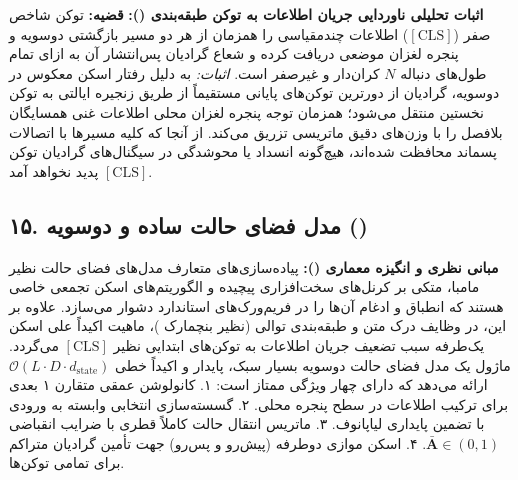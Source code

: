 \textbf{اثبات تحلیلی ناوردایی جریان اطلاعات به توکن طبقه‌بندی ():}
\textbf{قضیه:} توکن شاخص صفر ($[\text{CLS}]$) اطلاعات چندمقیاسی را همزمان از هر دو مسیر بازگشتی دوسویه و پنجره لغزان موضعی دریافت کرده و شعاع گرادیان پس‌انتشار آن به ازای تمام طول‌های دنباله $N$ کران‌دار و غیرصفر است.
\textit{اثبات:} به دلیل رفتار اسکن معکوس در  دوسویه، گرادیان از دورترین توکن‌های پایانی مستقیماً از طریق زنجیره ایالتی به توکن نخستین منتقل می‌شود؛ همزمان توجه پنجره لغزان محلی اطلاعات غنی همسایگان بلافصل را با وزن‌های دقیق ماتریسی تزریق می‌کند. از آنجا که کلیه مسیرها با اتصالات پسماند محافظت شده‌اند، هیچ‌گونه انسداد یا محوشدگی در سیگنال‌های گرادیان توکن $[\text{CLS}]$ پدید نخواهد آمد.



\subsection*{۱۵. مدل فضای حالت ساده و دوسویه  ()}

\textbf{مبانی نظری و انگیزه معماری ():}
پیاده‌سازی‌های متعارف مدل‌های فضای حالت نظیر مامبا، متکی بر کرنل‌های سخت‌افزاری پیچیده و الگوریتم‌های اسکن تجمعی خاصی هستند که انطباق و ادغام آن‌ها را در فریم‌ورک‌های استاندارد دشوار می‌سازد. علاوه بر این، در وظایف درک متن و طبقه‌بندی توالی (نظیر بنچمارک )، ماهیت اکیداً علی اسکن یک‌طرفه سبب تضعیف جریان اطلاعات به توکن‌های ابتدایی نظیر $[\text{CLS}]$ می‌گردد.
ماژول  یک مدل فضای حالت دوسویه بسیار سبک، پایدار و اکیداً خطی $\mathcal{O}(L \cdot D \cdot d_{\text{state}})$ ارائه می‌دهد که دارای چهار ویژگی ممتاز است:
۱. کانولوشن عمقی متقارن ۱ بعدی برای ترکیب اطلاعات در سطح پنجره محلی.
۲. گسسته‌سازی انتخابی وابسته به ورودی با تضمین پایداری لیاپانوف.
۳. ماتریس انتقال حالت کاملاً قطری با ضرایب انقباضی $\bar{\mathbf{A}} \in (0, 1)$.
۴. اسکن موازی دوطرفه (پیش‌رو و پس‌رو) جهت تأمین گرادیان متراکم برای تمامی توکن‌ها.

